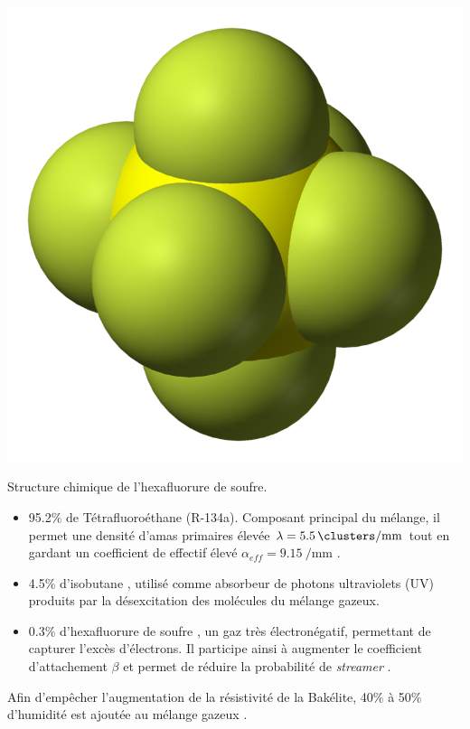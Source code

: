 \marginpar
{
	\centering
	\includegraphics[width=\marginparwidth]{RPC/Sulfurhexafluoride.png}
	\captionsetup{type=subfigure}\caption{Structure chimique de l'hexafluorure de soufre.}
	\label{hexa}
}

\begin{itemize}[label=$\bullet$]
\item \num{95.2}\% de Tétrafluoroéthane  (R-134a). Composant principal du mélange, il permet une densité d'amas primaires élevée $\lambda=\SI{5.5}{\clusters\per\milli\meter}$ tout en gardant un coefficient de  effectif élevé $\alpha_{eff}=\SI{9.15}{\per\milli\meter}$ \cite{CMS-NOTE-1997-004}.
\item \num{4.5}\% d'isobutane , utilisé comme absorbeur de photons ultraviolets (UV) produits par la désexcitation des molécules du mélange gazeux.
\item \num{0.3}\% d'hexafluorure de soufre , un gaz très électronégatif, permettant de capturer l'excès d'électrons. Il participe ainsi à augmenter le coefficient d'attachement $\beta$ et permet de réduire la probabilité de \textit{streamer} \cite{Camarri:685607}.
\end{itemize}

Afin d'empêcher l'augmentation de la résistivité de la Bakélite, \num{40}\% à \num{50}\% d'humidité est ajoutée au mélange gazeux \cite{Abbrescia:2004fv}.

